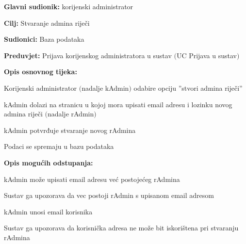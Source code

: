 					\noindent {}
					\begin{packed_item}
	
						\item \textbf{Glavni sudionik:} korijenski administrator
						\item  \textbf{Cilj:} Stvaranje admina riječi
						\item  \textbf{Sudionici:} Baza podataka
						\item  \textbf{Preduvjet:} Prijava korijenskog administratora u sustav $($UC Prijava u sustav$)$
						\item  \textbf{Opis osnovnog tijeka:}
						
						\item[] \begin{packed_enum}
	
							\item Korijenski administrator $($nadalje kAdmin$)$ odabire opciju ”stvori admina riječi”
							\item kAdmin dolazi na stranicu u kojoj mora upisati email adresu i lozinku novog admina riječi $($nadalje rAdmin$)$
							\item kAdmin potvrđuje stvaranje novog rAdmina
							\item Podaci se spremaju u bazu podataka
						\end{packed_enum}
						
						\item  \textbf{Opis mogućih odstupanja:}
						
						\item[] \begin{packed_item}
	
							\item[2.a] kAdmin može upisati email adresu već postojećeg rAdmina
							\item[] \begin{packed_enum}
								
								\item Sustav ga upozorava da vec postoji rAdmin s upisanom email adresom							
							\end{packed_enum}

							\item[2.b] kAdmin unosi email korisnika
							\item[] \begin{packed_enum}
								
								\item Sustav ga upozorava da korisnička adresa ne može bit iskorištena pri stvaranju rAdmina								
							\end{packed_enum}
							
						\end{packed_item}
					\end{packed_item}

